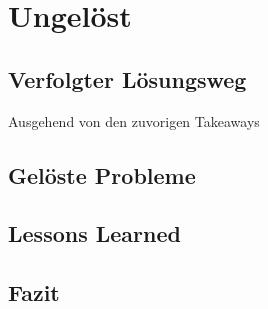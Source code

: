 \section{Ungelöst}
\subsection{Verfolgter Lösungsweg}%
Ausgehend von den zuvorigen Takeaways
\subsection{Gelöste Probleme}
\subsection{Lessons Learned}
\subsection{Fazit}